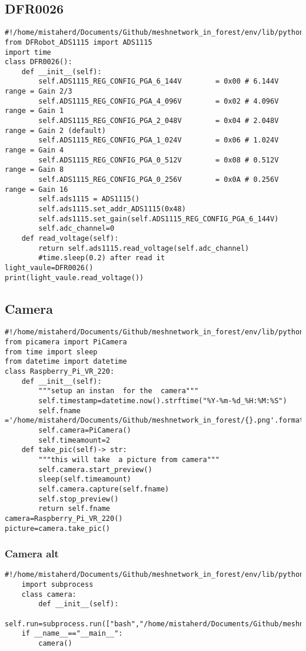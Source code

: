 \newpage
\subsection{DFR0026}
\begin{lstlisting}[style=mystyle,caption={Code for  DFR00026}]
#!/home/mistaherd/Documents/Github/meshnetwork_in_forest/env/lib/python3.11
from DFRobot_ADS1115 import ADS1115
import time
class DFR0026():
    def __init__(self):
        self.ADS1115_REG_CONFIG_PGA_6_144V        = 0x00 # 6.144V range = Gain 2/3
        self.ADS1115_REG_CONFIG_PGA_4_096V        = 0x02 # 4.096V range = Gain 1
        self.ADS1115_REG_CONFIG_PGA_2_048V        = 0x04 # 2.048V range = Gain 2 (default)
        self.ADS1115_REG_CONFIG_PGA_1_024V        = 0x06 # 1.024V range = Gain 4
        self.ADS1115_REG_CONFIG_PGA_0_512V        = 0x08 # 0.512V range = Gain 8
        self.ADS1115_REG_CONFIG_PGA_0_256V        = 0x0A # 0.256V range = Gain 16
        self.ads1115 = ADS1115()
        self.ads1115.set_addr_ADS1115(0x48)
        self.ads1115.set_gain(self.ADS1115_REG_CONFIG_PGA_6_144V)
        self.adc_channel=0
    def read_voltage(self):
        return self.ads1115.read_voltage(self.adc_channel)
        #time.sleep(0.2) after read it
light_vaule=DFR0026()
print(light_vaule.read_voltage())  

\end{lstlisting}
\newpage
\subsection{Camera}
\begin{lstlisting}[style=mystyle,caption={Code for Camera}]
#!/home/mistaherd/Documents/Github/meshnetwork_in_forest/env/lib/python3.11
from picamera import PiCamera
from time import sleep
from datetime import datetime
class Raspberry_Pi_VR_220:
    def __init__(self):
        """setup an instan  for the  camera"""
        self.timestamp=datetime.now().strftime("%Y-%m-%d_%H:%M:%S")
        self.fname ='/home/mistaherd/Documents/Github/meshnetwork_in_forest/{}.png'.format(self.timestamp)
        self.camera=PiCamera()
        self.timeamount=2
    def take_pic(self)-> str:
        """this will take  a picture from camera"""
        self.camera.start_preview()
        sleep(self.timeamount)
        self.camera.capture(self.fname)
        self.stop_preview()
        return self.fname
camera=Raspberry_Pi_VR_220()
picture=camera.take_pic()
\end{lstlisting}
\newpage
\subsubsection{Camera alt}
\begin{lstlisting}[style=mystyle,caption={Code for alternaive code for Camera}]
	#!/home/mistaherd/Documents/Github/meshnetwork_in_forest/env/lib/python3.11
	import subprocess
	class camera:
		def __init__(self):
			self.run=subprocess.run(["bash","/home/mistaherd/Documents/Github/meshnetwork_in_forest/bash_scrpits/camerea.sh"])
	if __name__=="__main__":
		camera()
\end{lstlisting}
\newpage 
